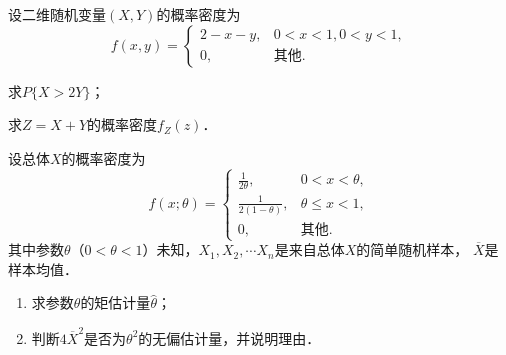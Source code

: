 \documentclass[plain,noanswer,medmath]{../../template/jnuexam}
\begin{document}
\begin{problem}[points=11]
设二维随机变量$(X,Y)$的概率密度为
$$f(x,y) = \begin{cases}
  2 - x - y, & 0 < x < 1,0 < y < 1, \\
  0, & \text{其他}.
\end{cases}$$
\begin{enumerate*}
  \item 求$P\{X > 2Y\}$；
  \item 求$Z = X + Y$的概率密度$f_Z(z)$．
\end{enumerate*}
\end{problem}

\begin{problem}[points=11]
设总体$X$的概率密度为
$$f(x;\theta) = \begin{cases}
  \frac{1}{2\theta}, & 0 < x < \theta , \\
  \frac{1}{2(1-\theta)}, & \theta \le x < 1, \\
  0, & \text{其他}.
\end{cases}$$
其中参数$\theta$（$0 < \theta < 1$）未知，$X_1,X_2,\cdots X_n$是来自总体$X$的简单随机样本，
$\overline{X}$是样本均值．
\begin{enumerate}
  \item 求参数$\theta$的矩估计量$\widehat{\theta}$；
  \item 判断$4\overline{X}^2$是否为$\theta^2$的无偏估计量，并说明理由．
\end{enumerate}
\end{problem}
\end{document}
